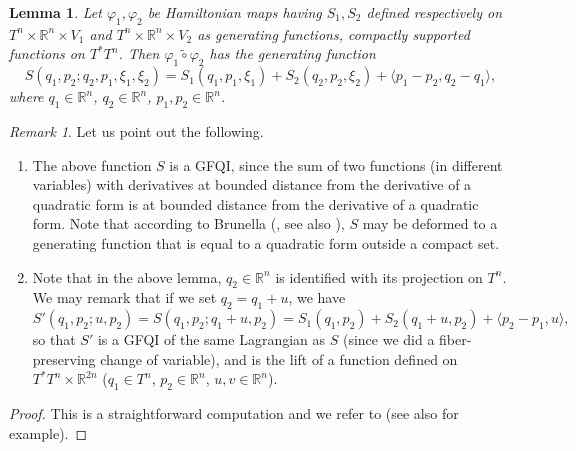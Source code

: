 \documentclass[JEP,XML,SOM,NoFloatCountersInSection,Unicode,published]{cedram}
\numberwithin{equation}{section}
\newcommand{\GFQI}{\textup{GFQI}\xspace}
\theoremstyle{plain}
\newtheorem{lemma}[theorem]{Lemma}
\theoremstyle{definition}
\theoremstyle{remark}
\newtheorem{remark}[theorem]{Remark}
\begin{document}
\begin{lemma}\label{Lem-5.2} Let $\varphi_{1}, \varphi_{2}$ be
Hamiltonian maps having ${S}_{1},{S}_{2}$ defined respectively on $ T^n\times {\mathbb R} ^n\times V_1$ and $ T^n\times {\mathbb R} ^n\times V_2$ as
generating functions, compactly supported functions on $T^*T^n$.
Then $\widetilde{\varphi_{1}\circ \varphi_{2}}$ has the
generating function
\[
{S}(q_{1}, p_{2} ; q_{2},p_{1},\xi_1, \xi_2) ={S}_{1} (q_{1},p_{1},\xi_1) + {S}_{2} (q_{2},p_{2},\xi_2) + \langle p_{1} - p_{2}, q_{2} - q_{1} \rangle,
\]
where $q_{1}\in {\mathbb R}^n$, $q_{2}\in {\mathbb R}^n$, $p_{1},p_{2}\in {\mathbb R} ^n$.
\end{lemma}

\begin{remark} Let us point out the following.
\begin{enumerate} \label{rem-5.4}
\item \label{GFQI-real} The above function $S$ is a \GFQI, since the sum of two functions (in different variables) with derivatives at bounded distance from the derivative of a quadratic form
is at bounded distance from the derivative of a quadratic form. Note that according to Brunella (\cite{Brunella}, see also \cite[Prop.\,1.6]{Viterbo-Montreal}), $S$ may be deformed to a generating function that is equal to a quadratic form outside a compact set.

\item Note that in the above lemma, $q_{2}\in {\mathbb R} ^n$ is identified with its projection on $T^n$.
We may remark that if we set $q_{2} = q_{1} + u$, we have
\[
S'(q_1,p_2;u,p_2)=
{S} (q_{1}, p_{2} ; q_{1} + u, p_{2}) =
{S}_{1} (q_{1}, p_{2}) + {S}_{2} (q_{1}+ u,
p_{2}) + \langle p_2-p_1, u\rangle,
\]
so that ${S'}$ is a \GFQI of the same Lagrangian as $S$ (since we did a fiber-preserving change of variable), and is the lift of a function defined on $T^{*}T^{n}\times {\mathbb R}^{2n}$ ($q_{1}\in T^{n}$, $p_{2}\in {\mathbb R}^{n}$, $u,v \in {\mathbb R}^{n}$).
\end{enumerate}
\end{remark}
\begin{proof} This is a straightforward computation and we refer to \cite[Th.\,4.1]{Chekanov} (see also \cite{Chaperon2} for example).
\end{proof}
\end{document}
